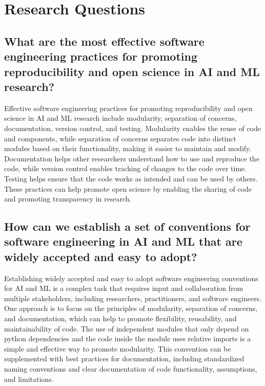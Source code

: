 
\section{Research Questions}


\subsection{
    What are the most effective software engineering practices for promoting reproducibility and open science in AI and ML research?}
    Effective software engineering practices for promoting reproducibility and open science in AI and ML research include modularity, separation of concerns, documentation, version control, and testing. Modularity enables the reuse of code and components, while separation of concerns separates code into distinct modules based on their functionality, making it easier to maintain and modify. Documentation helps other researchers understand how to use and reproduce the code, while version control enables tracking of changes to the code over time. Testing helps ensure that the code works as intended and can be used by others. These practices can help promote open science by enabling the sharing of code and promoting transparency in research.
    
\subsection{
    How can we establish a set of conventions for software engineering in AI and ML that are widely accepted and easy to adopt?}
    Establishing widely accepted and easy to adopt software engineering conventions for AI and ML is a complex task that requires input and collaboration from multiple stakeholders, including researchers, practitioners, and software engineers. One approach is to focus on the principles of modularity, separation of concerns, and documentation, which can help to promote flexibility, reusability, and maintainability of code. The use of independent modules that only depend on python dependencies and the code inside the module uses relative imports is a simple and effective way to promote modularity. This convention can be supplemented with best practices for documentation, including standardized naming conventions and clear documentation of code functionality, assumptions, and limitations.
    

